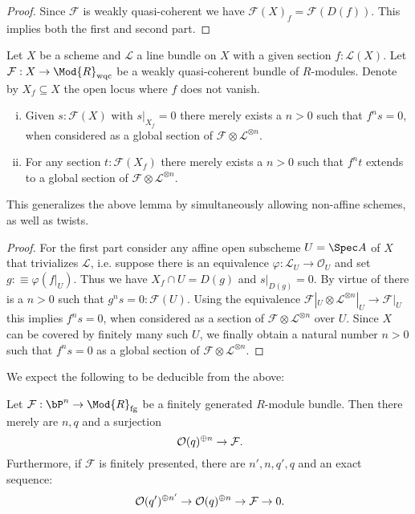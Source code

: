 \begin{proof}
  Since $\mathcal F$ is weakly quasi-coherent we have $\mathcal F (X)_f = \mathcal F (D(f))$.
  This implies both the first and second part.
\end{proof}


\begin{lemma}
  \label{affine-extension-of-sections}
  Let $X$ be a scheme and $\mathcal L$ a line bundle on $X$ with a given section $f:\mathcal L(X)$.
  Let $\mathcal F:X\to \Mod{R}_{\mathrm{wqc}}$ be a weakly quasi-coherent bundle of $R$-modules.
  Denote by $X_f \subseteq X$ the open locus where $f$ does not vanish.
  \begin{enumerate}[(i)]
    \item Given $s:\mathcal F(X)$ with $s|_{X_f} = 0$ there merely exists a $n>0$ such that $f^ns=0$,
      when considered as a global section of $\mathcal F \otimes \mathcal L^{\otimes n}$.
    \item For any section $t:\mathcal F (X_f)$ there merely exists a $n>0$
      such that $f^nt$ extends to a global section of $\mathcal F \otimes \mathcal L^{\otimes n}$.
  \end{enumerate}
\end{lemma}

This generalizes the above lemma by simultaneously allowing non-affine schemes, as well as twists.

\begin{proof}
  For the first part consider any affine open subscheme $U=\Spec A$ of $X$ that trivializes $\mathcal L$,
  i.e. suppose there is an equivalence  $\varphi:\mathcal L_U \to \mathcal O_U$ and set $g :\equiv \varphi(f|_U)$.
  Thus we have $X_f\cap U = D(g)$ and $s|_{D(g)}=0$.
  By virtue of  there is a $n>0$ such that $g^ns=0: \mathcal F(U)$.
  Using the equivalence $\mathcal F|_U\otimes\mathcal L^{\otimes n}|_U \to \mathcal F|_U$ this implies $f^ns=0$,
  when considered as a section of $\mathcal F\otimes\mathcal L^{\otimes n}$ over $U$.
  Since $X$ can be covered by finitely many such $U$, we finally obtain a natural number $n>0$ such that $f^ns=0$ as a global section of $\mathcal F\otimes\mathcal L^{\otimes n}$.

\end{proof}

We expect the following to be deducible from the above:

\begin{lemma}
  \label{fp-module-bundle-globally-generated}
  Let $\mathcal F:\bP^n \to \Mod{R}_{\mathrm{fg}}$ be a finitely generated $R$-module bundle.
  Then there merely are $n,q$ and a surjection
  \[ \mathcal O(q)^{\oplus n}\to \mathcal F\rlap{.}\]
  Furthermore, if $\mathcal F$ is finitely presented, there are $n',n,q',q$ and an exact sequence:
  \[ \mathcal O(q')^{\oplus n'}\to \mathcal O(q)^{\oplus n}\to \mathcal F\to 0\rlap{.}\]
\end{lemma}

